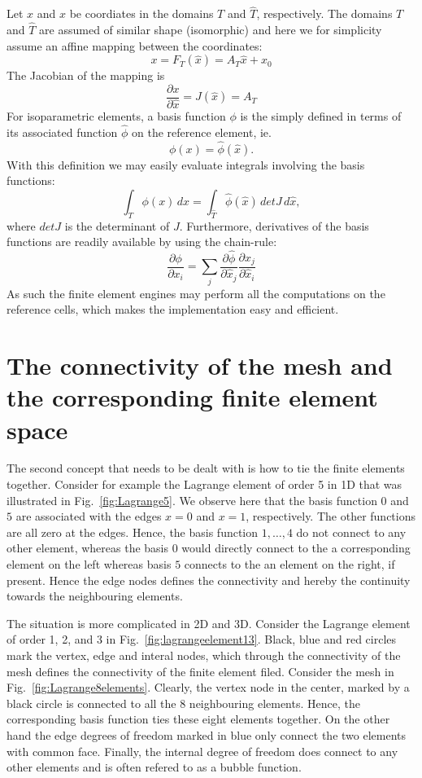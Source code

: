 Let $x$ and $\hat{x}$ be coordiates in the domains $T$ and $\hat{T}$, respectively. 
The domains $T$ and $\hat{T}$ are assumed of similar shape (isomorphic) 
and here we  
for simplicity assume an affine mapping between the coordinates:  
\[
x = F_T(\hat{x}) = A_T \hat{x} + x_0   
\]
The Jacobian of the mapping is 
\[
\frac{\partial x}{\partial \hat{x}} = J(\hat{x}) = A_T      
\]
For isoparametric elements, a basis function $\phi$
is the simply defined in terms of its associated function $\hat{\phi}$
on the reference
element, ie. 
\[
\phi(x) = \hat{\phi}(\hat{x}) .  
\]
With this definition we may easily evaluate integrals involving the basis functions: 
\[
\int_T \phi(x) \, dx = \int_{\hat{T}} \hat{\phi}(\hat{x}) \, det J \, d\hat{x},  
\]
where $det J$ is the determinant of $J$.  Furthermore, derivatives of the basis functions are readily available by using the chain-rule:  
\[
\frac{\partial \phi}{\partial x_i } = \sum_j  \frac{\partial \hat{\phi}}{\partial \hat{x}_j } \frac{\partial \hat{x}_j}{\partial \hat{x}_i } 
\]
As such the finite element engines may perform all the computations on the reference cells, which makes the implementation easy and efficient. 

\section{The connectivity of the mesh and the corresponding finite element space}

The second concept that needs to be dealt with is how to tie the finite elements together. 
Consider for example the Lagrange element of order 5 in 1D that was illustrated in Fig.~\ref{fig:Lagrange5}. We observe here that the basis function $0$ and $5$ are associated
with the edges $x=0$ and $x=1$, respectively. The other functions are all zero at the edges. Hence, the basis function $1, \ldots, 4$ do not connect 
to any other element, whereas the basis $0$ would directly connect to the a corresponding element on the left whereas basis $5$ connects to the 
an element on the right, if present. Hence the edge nodes defines the connectivity and hereby the continuity towards the neighbouring elements. 

The situation is more complicated in 2D and 3D. Consider the Lagrange element of order 1, 2, and 3 in Fig.~\ref{fig:lagrangeelement13}. Black, blue and red circles mark
the vertex, edge and interal nodes, which through the connectivity of the mesh defines the connectivity of the finite element filed. 
Consider the mesh in Fig.~\ref{fig:Lagrange8elements}. Clearly, the vertex node in the center, marked by a black circle is connected to all the 8 neighbouring elements. 
Hence, the corresponding basis function ties these eight elements together. On the other hand the edge degrees of freedom marked in 
blue only connect the two elements with common face. Finally, the internal degree of freedom does connect to any other elements and is often refered to as a bubble
function. 


